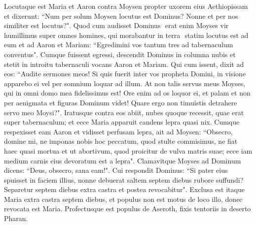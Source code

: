 \begin{biblechapter}  
\verse Locutaque est Maria et Aaron contra Moysen propter uxorem eius Aethiopissam 
\verse et dixerunt: “Num per solum Moysen locutus est Dominus? Nonne et per nos similiter est locutus?". Quod cum audisset Dominus 
\verse ­ erat enim Moyses vir humillimus super omnes homines, qui morabantur in terra ­  
\verse statim locutus est ad eum et ad Aaron et Mariam: “Egredimini vos tantum tres ad tabernaculum conventus". Cumque fuissent egressi, 
\verse descendit Dominus in columna nubis et stetit in introitu tabernaculi vocans Aaron et Mariam. Qui cum issent, 
\verse dixit ad eos: “Audite sermones meos! Si quis fuerit inter vos propheta Domini, in visione apparebo ei vel per somnium loquar ad illum. 
\verse At non talis servus meus Moyses, qui in omni domo mea fidelissimus est! 
\verse Ore enim ad os loquor ei, et palam et non per aenigmata et figuras Dominum videt! Quare ergo non timuistis detrahere servo meo Moysi?". 
\verse Iratusque contra eos abiit, 
\verse nubes quoque recessit, quae erat super tabernaculum; et ecce Maria apparuit candens lepra quasi nix. Cumque respexisset eam Aaron et vidisset perfusam lepra, 
\verse ait ad Moysen: “Obsecro, domine mi, ne imponas nobis hoc peccatum, quod stulte commisimus,  
\verse ne fiat haec quasi mortua et ut abortivum, quod proicitur de vulva matris suae; ecce iam medium carnis eius devoratum est a lepra". 
\verse Clamavitque Moyses ad Dominum dicens: “Deus, obsecro, sana eam!". 
\verse Cui respondit Dominus: “Si pater eius spuisset in faciem illius, nonne debuerat saltem septem diebus rubore suffundi? Separetur septem diebus extra castra et postea revocabitur". 
\verse Exclusa est itaque Maria extra castra septem diebus, et populus non est motus de loco illo, donec revocata est Maria. 
\verse Profectusque est populus de Aseroth, fixis tentoriis in deserto Pharan. 
\end{biblechapter}

